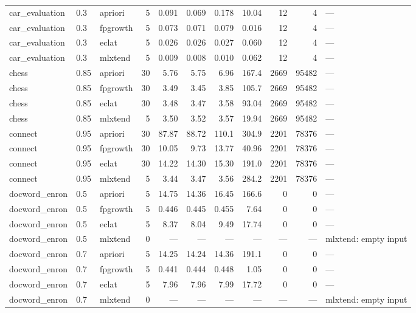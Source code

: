 \documentclass[journal,a4paper]{IEEEtran}
\begin{document}
\begin{longtable}{p{3.0cm}llrrrrrrrp{2.4cm}}
car\_\allowbreak{}evaluation & 0.3 & apriori & 5 & 0.091 & 0.069 & 0.178 & 10.04 & 12 & 4 & --- \\
car\_\allowbreak{}evaluation & 0.3 & fpgrowth & 5 & 0.073 & 0.071 & 0.079 & 0.016 & 12 & 4 & --- \\
car\_\allowbreak{}evaluation & 0.3 & eclat & 5 & 0.026 & 0.026 & 0.027 & 0.060 & 12 & 4 & --- \\
car\_\allowbreak{}evaluation & 0.3 & mlxtend & 5 & 0.009 & 0.008 & 0.010 & 0.062 & 12 & 4 & --- \\
chess & 0.85 & apriori & 30 & 5.76 & 5.75 & 6.96 & 167.4 & 2669 & 95482 & --- \\
chess & 0.85 & fpgrowth & 30 & 3.49 & 3.45 & 3.85 & 105.7 & 2669 & 95482 & --- \\
chess & 0.85 & eclat & 30 & 3.48 & 3.47 & 3.58 & 93.04 & 2669 & 95482 & --- \\
chess & 0.85 & mlxtend & 5 & 3.50 & 3.52 & 3.57 & 19.94 & 2669 & 95482 & --- \\
connect & 0.95 & apriori & 30 & 87.87 & 88.72 & 110.1 & 304.9 & 2201 & 78376 & --- \\
connect & 0.95 & fpgrowth & 30 & 10.05 & 9.73 & 13.77 & 40.96 & 2201 & 78376 & --- \\
connect & 0.95 & eclat & 30 & 14.22 & 14.30 & 15.30 & 191.0 & 2201 & 78376 & --- \\
connect & 0.95 & mlxtend & 5 & 3.44 & 3.47 & 3.56 & 284.2 & 2201 & 78376 & --- \\
docword\_\allowbreak{}enron & 0.5 & apriori & 5 & 14.75 & 14.36 & 16.45 & 166.6 & 0 & 0 & --- \\
docword\_\allowbreak{}enron & 0.5 & fpgrowth & 5 & 0.446 & 0.445 & 0.455 & 7.64 & 0 & 0 & --- \\
docword\_\allowbreak{}enron & 0.5 & eclat & 5 & 8.37 & 8.04 & 9.49 & 17.74 & 0 & 0 & --- \\
docword\_\allowbreak{}enron & 0.5 & mlxtend & 0 & --- & --- & --- & --- & --- & --- & mlxtend: empty input \\
docword\_\allowbreak{}enron & 0.7 & apriori & 5 & 14.25 & 14.24 & 14.36 & 191.1 & 0 & 0 & --- \\
docword\_\allowbreak{}enron & 0.7 & fpgrowth & 5 & 0.441 & 0.444 & 0.448 & 1.05 & 0 & 0 & --- \\
docword\_\allowbreak{}enron & 0.7 & eclat & 5 & 7.96 & 7.96 & 7.99 & 17.72 & 0 & 0 & --- \\
docword\_\allowbreak{}enron & 0.7 & mlxtend & 0 & --- & --- & --- & --- & --- & --- & mlxtend: empty input \\

\end{longtable}
\end{document}
